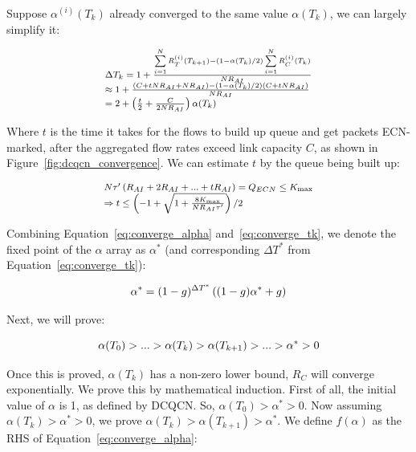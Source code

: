 Suppose $\alpha^{(i)}({T_k})$ already converged to the same value $\alpha ({T_k})$, we can largely simplify it:

\begin{equation}
\small
\begin{array}{l}
\Delta {T_k} = 1 + \frac{{\sum\limits_{i = 1}^N {R_T^{(i)}({T_{k + 1}})}  - \left( {1 - \alpha ({T_k})/2} \right)\sum\limits_{i = 1}^N {R_C^{(i)}({T_k})} }}{{N{R_{AI}}}}\\
 \approx 1 + \frac{{\left( {C + tN{R_{AI}} + N{R_{AI}}} \right) - \left( {1 - \alpha ({T_k})/2} \right)\left( {C + tN{R_{AI}}} \right)}}{{N{R_{AI}}}}\\
 = 2 + \left( {\frac{t}{2} + \frac{C}{{2N{R_{AI}}}}} \right)\alpha ({T_k})
\end{array}
\label{eq:converge_tk}
\end{equation}

Where $t$ is the time it takes for the flows to build up queue and get packets ECN-marked, after
the aggregated flow rates exceed link capacity $C$, as shown in Figure~\ref{fig:dcqcn_convergence}.
We can estimate $t$ by the queue being built up:

\begin{equation}
\small
\begin{array}{l}
N\tau '\left( {{R_{AI}} + 2{R_{AI}} + ... + t{R_{AI}}} \right) = {Q_{ECN}} \le {K_{\max }}\\
 \Rightarrow t \le \left( { - 1 + \sqrt {1 + \frac{{8{K_{\max }}}}{{N{R_{AI}}\tau '}}} } \right)/2
\end{array}
\end{equation}

Combining Equation~\ref{eq:converge_alpha} and~\ref{eq:converge_tk}, we denote the fixed point of 
the $\alpha$ array as $\alpha^{*}$ (and corresponding $\Delta T^{*}$ from Equation~\ref{eq:converge_tk}):

\begin{equation}
\small
{\alpha ^*} = {(1 - g)^{\Delta {T^*}}}\left( {(1 - g){\alpha ^*} + g} \right)
\end{equation}

Next, we will prove:

\begin{equation}
\small
\alpha ({T_0}) > ... > \alpha ({T_k}) > \alpha ({T_{k + 1}}) > ... > {\alpha ^*} > 0
\end{equation}

Once this is proved, $\alpha ({T_k})$ has a non-zero lower bound, $R_C$ will converge exponentially.
We prove this by mathematical induction. First of all, the initial value of $\alpha$ is 1, as defined
by DCQCN. So, $\alpha ({T_0}) > {\alpha ^*} > 0$. Now assuming $\alpha ({T_k}) > {\alpha ^*} > 0$, we 
prove $\alpha ({T_k}) > \alpha ({T_{k+1}}) > {\alpha ^*}$. We define $f(\alpha)$ as the RHS of 
Equation~\ref{eq:converge_alpha}:

